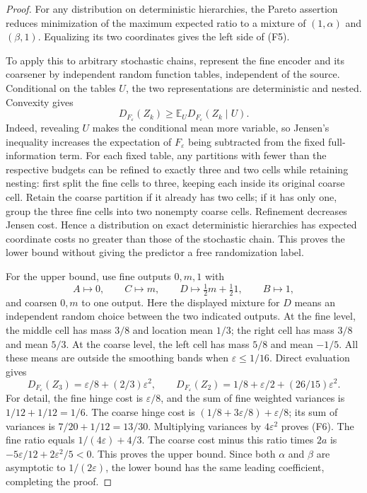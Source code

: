 \begin{proof}
For any distribution on deterministic hierarchies, the Pareto assertion
reduces minimization of the maximum expected ratio to a mixture of
$(1,\alpha)$ and $(\beta,1)$.  Equalizing its two coordinates gives
the left side of (F5).

To apply this to arbitrary stochastic chains, represent the fine
encoder and its coarsener by independent random function tables,
independent of the source.  Conditional on the tables $U$, the two
representations are deterministic and nested.  Convexity gives
\[
 D_{F_\varepsilon}(Z_k)
 \geq\mathbb E_U D_{F_\varepsilon}(Z_k\mid U).
\]
Indeed, revealing $U$ makes the conditional mean more variable, so
Jensen's inequality increases the expectation of $F_\varepsilon$ being
subtracted from the fixed full-information term.  For each fixed table,
any partitions with fewer than the respective budgets can be refined
to exactly three and two cells while retaining nesting: first split the
fine cells to three, keeping each inside its original coarse cell.
Retain the coarse partition if it already has two cells; if it has only
one, group the three fine cells into two nonempty coarse cells.
Refinement decreases Jensen cost.  Hence a distribution
on exact deterministic hierarchies has expected coordinate costs no
greater than those of the stochastic chain.  This proves the lower
bound without giving the predictor a free randomization label.

For the upper bound, use fine outputs $0,m,1$ with
\[
 A\mapsto0,\qquad C\mapsto m,\qquad
 D\mapsto\tfrac12 m+\tfrac12 1,\qquad B\mapsto1,
\]
and coarsen $0,m$ to one output.  Here the displayed mixture for $D$
means an independent random choice between the two indicated outputs.
At the fine level, the middle cell has mass $3/8$ and location mean
$1/3$; the right cell has mass $3/8$ and mean $5/3$.
At the coarse level, the left cell has mass $5/8$ and mean $-1/5$.
All these means are outside the smoothing bands when
$\varepsilon\leq1/16$.  Direct evaluation gives
\[
 D_{F_\varepsilon}(Z_3)
   =\varepsilon/8+(2/3)\varepsilon^2,\qquad
 D_{F_\varepsilon}(Z_2)
   =1/8+\varepsilon/2+(26/15)\varepsilon^2.
 \tag{F6}\label{eq:gadget-stochastic-costs}
\]
For detail, the fine hinge cost is $\varepsilon/8$, and the sum of
fine weighted variances is $1/12+1/12=1/6$.
The coarse hinge cost is
$(1/8+3\varepsilon/8)+\varepsilon/8$; its sum of variances is
$7/20+1/12=13/30$.  Multiplying variances by $4\varepsilon^2$
proves (F6).  The fine ratio equals $1/(4\varepsilon)+4/3$.
The coarse cost minus this ratio times $2a$ is
$-5\varepsilon/12+2\varepsilon^2/5<0$.
This proves the upper bound.  Since both $\alpha$ and $\beta$ are
asymptotic to $1/(2\varepsilon)$, the lower bound has the same
leading coefficient, completing the proof.
\end{proof}

